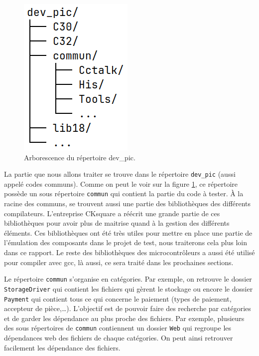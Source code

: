 \documentclass[a4paper]{article}
\begin{document}
\begin{figure}[h!]
  \begin{center}
    \includegraphics[scale=0.5]{./img/arborescence-devpic.png}
    \caption{Arborescence du répertoire dev\_pic.}
    \label{fig:repdevpic}
  \end{center}
\end{figure}

La partie que nous allons traiter se trouve dans le répertoire \verb|dev_pic|
(aussi appelé codes communs). Comme on peut le voir sur la figure
\ref{fig:repdevpic}, ce répertoire possède un sous répertoire \verb|commun| qui
contient la partie du code à tester. À la racine des communs, se trouvent aussi
une partie des bibliothèques des différents compilateurs. L'entreprise CKsquare
a réécrit une grande partie de ces bibliothèques pour avoir plus de maitrise
quand à la gestion des différents éléments. Ces bibliothèques ont été très
utiles pour mettre en place une partie de l'émulation des composants dans le
projet de test, nous traiterons cela plus loin dans ce rapport. Le reste des
bibliothèques des microcontrôleurs a aussi été utilisé pour compiler avec gcc,
là aussi, ce sera traité dans les prochaines sections.

Le répertoire \verb|commun| s'organise en catégories. Par exemple, on retrouve
le dossier \verb|StorageDriver| qui contient les fichiers qui gèrent le stockage
ou encore le dossier \verb|Payment| qui contient tous ce qui concerne le
paiement (types de paiement, accepteur de pièce,\dots). L'objectif est de
pouvoir faire des recherche par catégories et de garder les dépendance au plus
proche des fichiers. Par exemple, plusieurs des sous répertoires de
\verb|commun| contiennent un dossier \verb|Web| qui regroupe les dépendances web
des fichiers de chaque catégories. On peut ainsi retrouver facilement les
dépendance des fichiers.
\end{document}
